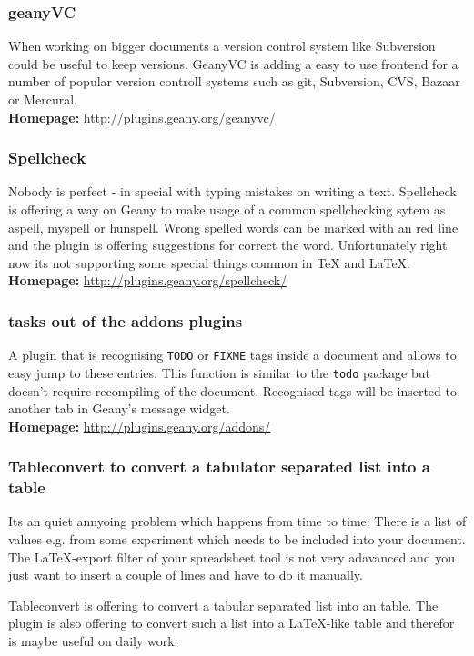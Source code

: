 \documentclass[%
paper=a4,%
fontsize=11pt,%
twoside=false,%
DIV18,%
headsepline,%
plainheadsepline,%
footsepline,%
plainfootsepline,%
bibliography=totoc,%
listof=totoc,%
BCOR10mm,%
parskip=half,%
openany,%
]{scrartcl}
\begin{document}
\subsubsection{geanyVC}
When working on bigger documents a version control system like
Subversion could be useful to keep versions. GeanyVC is adding a easy
to use frontend for a number of popular version controll systems such
as git, Subversion, CVS, Bazaar or Mercural.\\
\textbf{Homepage:} \url{http://plugins.geany.org/geanyvc/}

\subsubsection{Spellcheck}
Nobody is perfect - in special with typing mistakes on writing a
text. Spellcheck is offering a way on Geany to make usage of a
common spellchecking sytem as aspell, myspell or hunspell. Wrong
spelled words can be marked with an red line and the plugin is
offering suggestions for correct the word. Unfortunately right now
its not supporting some special things common in \TeX{} and \LaTeX{}.\\
\textbf{Homepage:} \url{http://plugins.geany.org/spellcheck/}

\subsubsection{tasks out of the addons plugins}
A plugin that is recognising \texttt{TODO} or \texttt{FIXME} tags
inside a document and allows to easy jump to these entries. This
function is similar to the \texttt{todo} package but doesn't require
recompiling of the document. Recognised tags will be inserted to
another tab in Geany's message widget.\\
\textbf{Homepage:} \url{http://plugins.geany.org/addons/}


\subsubsection{Tableconvert to convert a tabulator separated list into a table}

Its an quiet annyoing problem which happens from time to time: There
is a list of values e.g. from some experiment which needs to be
included into your document. The \LaTeX{}-export filter of your
spreadsheet tool is not very adavanced and you just want to insert a
couple of lines and have to do it manually.

Tableconvert is offering to convert a tabular separated list into an
table. The plugin is also offering to convert such a list into a
\LaTeX{}-like table and therefor is maybe useful on daily work.
\end{document}
